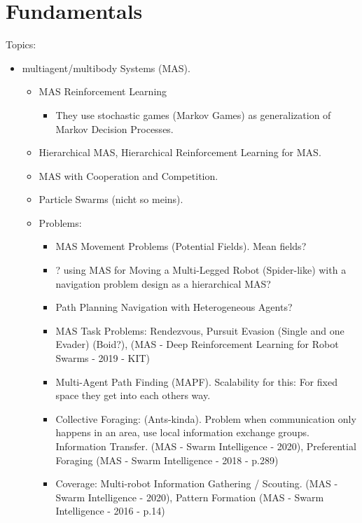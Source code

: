 
\chapter{Fundamentals}
\label{ch:Fundamentals}

Topics:
\begin{itemize}[noitemsep,nolistsep]
	\item multiagent/multibody Systems (MAS).
	\begin{itemize}[noitemsep,nolistsep]
		\item MAS Reinforcement Learning
		\begin{itemize}[noitemsep,nolistsep]
			\item They use stochastic games (Markov Games) as generalization of Markov Decision Processes.
		\end{itemize}
		\item Hierarchical MAS, Hierarchical Reinforcement Learning for MAS.
		\item MAS with Cooperation and Competition.
		\item Particle Swarms (nicht so meins).
		\item Problems:
		\begin{itemize}[noitemsep,nolistsep]
			\item MAS Movement Problems (Potential Fields). Mean fields?
			\item ? using MAS for Moving a Multi-Legged Robot (Spider-like) with a navigation problem design as a hierarchical MAS?
			\item Path Planning Navigation with Heterogeneous Agents? 
			\item MAS Task Problems: Rendezvous, Pursuit Evasion (Single and one Evader) (Boid?), (MAS - Deep Reinforcement Learning for Robot Swarms - 2019 - KIT)
			\item Multi-Agent Path Finding (MAPF). Scalability for this: For fixed space they get into each others way.
			\item Collective Foraging: (Ants-kinda). Problem when communication only happens in an area, use local information exchange groups. Information Transfer. (MAS - Swarm Intelligence - 2020), Preferential Foraging (MAS - Swarm Intelligence - 2018 - p.289)
			\item Coverage: Multi-robot Information Gathering / Scouting. (MAS - Swarm Intelligence - 2020), Pattern Formation (MAS - Swarm Intelligence - 2016 - p.14)

\end{itemize}
\end{itemize}
\end{itemize}
